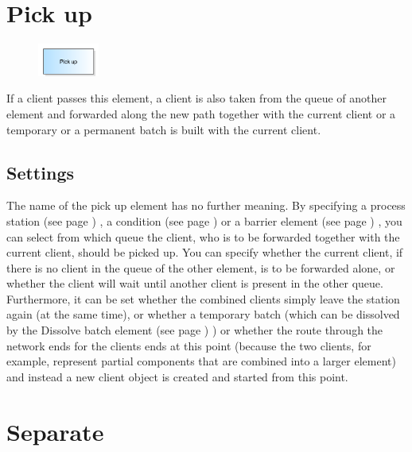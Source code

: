 \section{Pick up}
\label{ref:ModelElementPickUp}

\begin{figure}
\vspace{-22pt}
\includegraphics[width=2cm]{imageModelElementPickUp.png}
\vspace{-22pt}
\end{figure}

If a client passes this element, a client is also taken from the queue of another element and forwarded
along the new path together with the current client or a temporary or a permanent batch is built with the
current client.

\subsection*{Settings}

The name of the pick up element has no further meaning. By specifying a
process station (see page \pageref{ref:ModelElementProcess}) , a condition (see page \pageref{ref:ModelElementHold}) 
or a barrier element (see page \pageref{ref:ModelElementBarrier}) , you can select from which queue the client,
who is to be forwarded together with the current client, should be picked up. You can specify whether
the current client, if there is no client in the queue of the other element, is to be forwarded alone, or
whether the client will wait until another client is present in the other queue. Furthermore, it can be set whether
the combined clients simply leave the station again (at the same time), or whether a temporary batch (which
can be dissolved by the Dissolve batch element (see page \pageref{ref:ModelElementSeparate}) ) or whether the route
through the network ends for the clients ends at this point (because the two clients, for example, represent
partial components that are combined into a larger element) and instead a new client object is created and
started from this point.


\section{Separate}
\label{ref:ModelElementSeparate}

